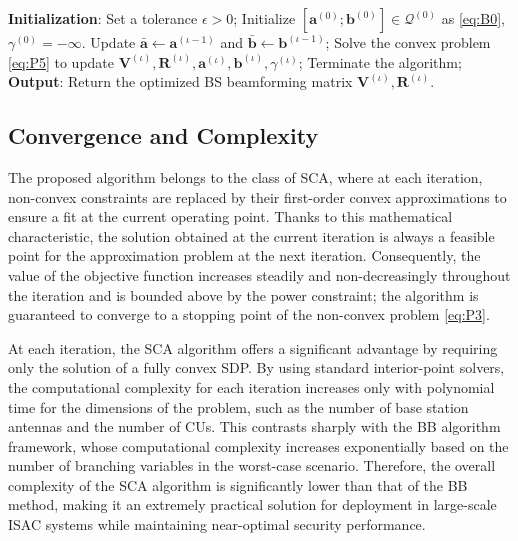 \documentclass[runningheads]{llncs}
\begin{document}
\begin{algorithm}[htb]
\caption{Iterative SCA Algorithm solving Problem \eqref{eq:P3}.}
\begin{algorithmic}[1]
\label{Alg:sca}
\STATE \textbf{Initialization}: 
\STATE Set a tolerance $\epsilon > 0$; 
\STATE Initialize $[\mathbf{a}^{(0)}; \mathbf{b}^{(0)}] \in \mathcal{Q}^{(0)}$ as \eqref{eq:B0}, $\gamma^{(0)} = -\infty $. 
\STATE Update $\bar{\mathbf{a}} \leftarrow \mathbf{a}^{(\iota-1)} $ and $\bar{\mathbf{b}} \leftarrow \mathbf{b}^{(\iota-1)} $;
\STATE Solve the convex problem \eqref{eq:P5} to update $\mathbf{V}^{(\iota)} , \mathbf{R}^{(\iota)}, \mathbf{a}^{(\iota)}, \mathbf{b}^{(\iota)}, \gamma^{(\iota)}$;
\STATE Terminate the algorithm;
\ENDIF
\ENDFOR
\STATE \textbf{Output}:
Return the optimized BS beamforming matrix $\mathbf{V}^{(\iota)} , \mathbf{R}^{(\iota)}$. 
\end{algorithmic}
\end{algorithm}

\subsection{Convergence and Complexity}
The proposed algorithm belongs to the class of SCA, where at each iteration, non-convex constraints are replaced by their first-order convex approximations to ensure a fit at the current operating point. Thanks to this mathematical characteristic, the solution obtained at the current iteration is always a feasible point for the approximation problem at the next iteration. Consequently, the value of the objective function increases steadily and non-decreasingly throughout the iteration and is bounded above by the power constraint; the algorithm is guaranteed to converge to a stopping point of the non-convex problem \eqref{eq:P3}. 

At each iteration, the SCA algorithm offers a significant advantage by requiring only the solution of a fully convex SDP. By using standard interior-point solvers, the computational complexity for each iteration increases only with polynomial time for the dimensions of the problem, such as the number of base station antennas and the number of CUs. This contrasts sharply with the BB algorithm framework, whose computational complexity increases exponentially based on the number of branching variables in the worst-case scenario. Therefore, the overall complexity of the SCA algorithm is significantly lower than that of the BB method, making it an extremely practical solution for deployment in large-scale ISAC systems while maintaining near-optimal security performance.
\end{document}
